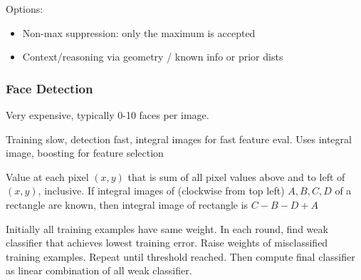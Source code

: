  Options:
\begin{itemize}
    \item Non-max suppression: only the maximum is accepted
    \item Context/reasoning via geometry / known info or prior dists
\end{itemize}


\subsubsection{Face Detection}
Very expensive, typically 0-10 faces per image.

 Training slow, detection fast, integral images for fast feature eval. Uses integral image, boosting for feature selection

 Value at each pixel $(x, y)$ that is sum of all pixel values above and to left of $(x, y)$, inclusive.
If integral images of (clockwise from top left) $A, B, C, D$ of a rectangle are known, then integral image of rectangle is $C - B - D + A$

\shortdefinition[Boosting] Initially all training examples have same weight. In each round, find weak classifier that achieves lowest  training error.
Raise weights of misclassified training examples. Repeat until threshold reached. Then compute final classifier as linear combination of all weak classifier.


